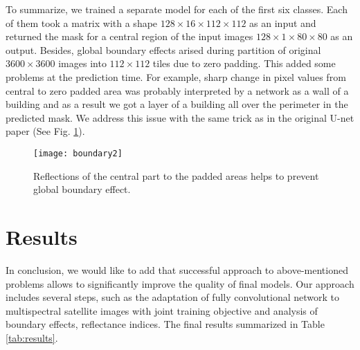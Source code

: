\documentclass[10pt,twocolumn,letterpaper]{article}
\begin{document}
To summarize, we trained a separate model for each of the first six classes. Each of them took a matrix with a shape $128 \times 16 \times 112 \times 112$ as an input and returned the mask for a central region of the input images $128 \times 1 \times 80 \times 80$ as an output. Besides, global boundary effects arised during partition of original $3600 \times 3600$ images into $112 \times 112$ tiles due to zero padding. This added some problems at the prediction time. For example, sharp change in pixel values from central to zero padded area was probably interpreted by a network as a wall of a building and as a result we got a layer of a building all over the perimeter in the predicted mask. We address this issue with the same trick as in the original U-net paper \cite{unet} (See Fig. \ref{fig:boundary2}).

\begin{figure}[!h]
	\captionsetup{justification=centering}
	\centering
	\texttt{[image: boundary2]}
	\caption{Reflections of the central part to the padded areas helps to prevent global boundary effect.}
	\label{fig:boundary2}
\end{figure}


\section{Results}

In conclusion, we would like to add that successful approach %
to above-mentioned problems allows to significantly improve the quality of final models. Our approach includes several steps, such as the adaptation of fully convolutional network to multispectral satellite images with joint training objective and analysis of boundary effects, reflectance indices. The final results summarized in Table \ref{tab:results}.
\end{document}
